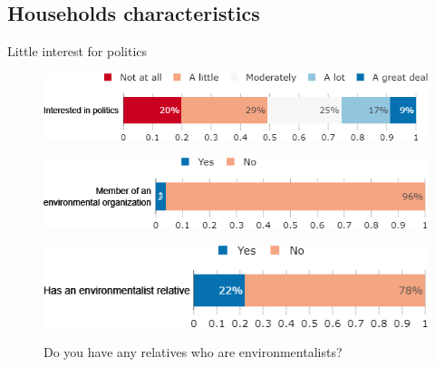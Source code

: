 \begin{framefont}{\small}
\subsection{Households characteristics}

\begin{frame}{Little interest for politics}%
\vspace{-.5cm}
\begin{figure}[h!]
\caption{To what extent are you interested in politics?}
\includegraphics[width=.52\paperwidth]{../figures/FR/interested_politics_FR.png} \\
\vspace{.1cm}
\caption{Are you member of an environmental organization?}
\includegraphics[width=.47\paperwidth]{../figures/FR/member_environmental_orga_FR.png}\\
\vspace{.1cm}
\caption{Do you have any relatives who are environmentalists?}
\includegraphics[width=.47\paperwidth]{../figures/FR/relative_environmentalist_FR.png}\\
\end{figure}
\end{frame}


\end{framefont}
